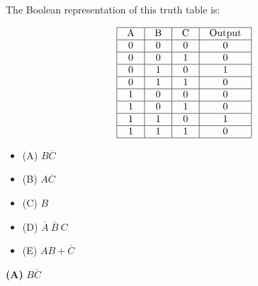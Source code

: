 

The Boolean representation of this truth table is:


$$\vbox{\offinterlineskip
\halign{\strut
\vrule \quad\hfil # \ \hfil & 
\vrule \quad\hfil # \ \hfil & 
\vrule \quad\hfil # \ \hfil & 
\vrule \quad\hfil # \ \hfil \vrule \cr
\noalign{\hrule}
%
A & B & C & Output \cr
%
\noalign{\hrule}
%
0 & 0 & 0 & 0 \cr
%
\noalign{\hrule}
%
0 & 0 & 1 & 0 \cr
%
\noalign{\hrule}
%
0 & 1 & 0 & 1 \cr
%
\noalign{\hrule}
%
0 & 1 & 1 & 0 \cr
%
\noalign{\hrule}
%
1 & 0 & 0 & 0 \cr
%
\noalign{\hrule}
%
1 & 0 & 1 & 0 \cr
%
\noalign{\hrule}
%
1 & 1 & 0 & 1 \cr
%
\noalign{\hrule}
%
1 & 1 & 1 & 0 \cr
%
\noalign{\hrule}
} %
}$$ %

\begin{itemize}
\item{(A)} $B \overline{C}$
\vskip 5pt 
\item{(B)} $A \overline{C}$
\vskip 5pt 
\item{(C)} $B$
\vskip 5pt 
\item{(D)} $\overline{A} \> \overline{B} \> C$
\vskip 5pt 
\item{(E)} $AB + \overline{C}$
\end{itemize}







{\bf (A)} $B \overline{C}$
 










